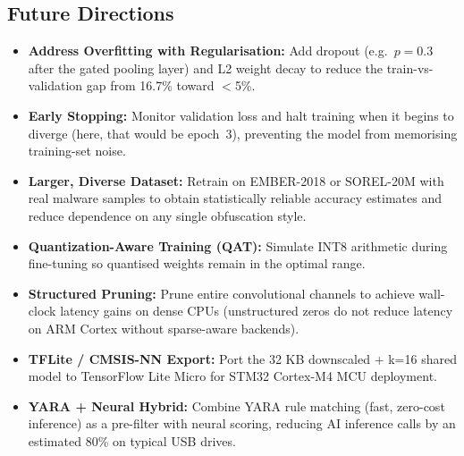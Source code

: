 \documentclass[12pt,a4paper]{article}
\begin{document}
\subsection{Future Directions}
\begin{itemize}
  \item \textbf{Address Overfitting with Regularisation:} Add dropout (e.g.\
        $p{=}0.3$ after the gated pooling layer) and L2 weight decay to reduce
        the train-vs-validation gap from 16.7\% toward $<$5\%.
  \item \textbf{Early Stopping:} Monitor validation loss and halt training when
        it begins to diverge (here, that would be epoch~3), preventing the
        model from memorising training-set noise.
  \item \textbf{Larger, Diverse Dataset:} Retrain on EMBER-2018 or SOREL-20M
        with real malware samples to obtain statistically reliable accuracy
        estimates and reduce dependence on any single obfuscation style.
  \item \textbf{Quantization-Aware Training (QAT):} Simulate INT8 arithmetic
        during fine-tuning so quantised weights remain in the optimal range.
  \item \textbf{Structured Pruning:} Prune entire convolutional channels to
        achieve wall-clock latency gains on dense CPUs (unstructured zeros
        do not reduce latency on ARM Cortex without sparse-aware backends).
  \item \textbf{TFLite / CMSIS-NN Export:} Port the 32 KB downscaled + k=16
        shared model to TensorFlow Lite Micro for STM32 Cortex-M4 MCU deployment.
  \item \textbf{YARA + Neural Hybrid:} Combine YARA rule matching (fast, zero-cost
        inference) as a pre-filter with neural scoring, reducing AI inference
        calls by an estimated 80\% on typical USB drives.
\end{itemize}
\end{document}
